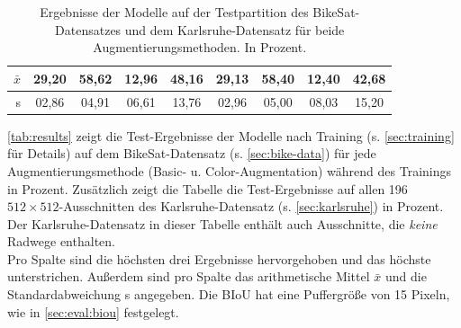 \begin{table}[ht]
\begin{tabular}{l|cc|cc|cc|cc}
		\bottomrule
		\multicolumn{1}{r|}{$\bar{x}$} & 29,20 & 58,62 & 12,96 & 48,16 & 29,13 & 58,40 & 12,40 & 42,68 \\
		\midrule
		\multicolumn{1}{r|}{s} & 02,86 & 04,91 & 06,61 & 13,76 & 02,96 & 05,00 & 08,03 & 15,20 \\


	\end{tabular}
	\caption{Ergebnisse der Modelle auf der Testpartition des BikeSat-Datensatzes und dem Karlsruhe-Datensatz
	für beide Augmentierungsmethoden. 
    In Prozent.}
	\label{tab:results}
\end{table}

\autoref{tab:results} zeigt die Test-Ergebnisse der Modelle nach Training (s. \autoref{sec:training} für Details) auf dem BikeSat-Datensatz 
(s. \autoref{sec:bike-data}) für jede Augmentierungsmethode (Basic- u. Color-Augmentation) während des Trainings in Prozent. 
Zusätzlich zeigt die Tabelle die Test-Ergebnisse auf allen 196 $512{\times}512$-Ausschnitten 
des Karlsruhe-Datensatz (s. \autoref{sec:karlsruhe}) in Prozent. Der Karlsruhe-Datensatz in dieser Tabelle
enthält auch Ausschnitte, die \textit{keine} Radwege enthalten. \\ 
Pro Spalte sind die höchsten drei Ergebnisse hervorgehoben und das höchste unterstrichen. 
Außerdem sind pro Spalte das arithmetische Mittel $\bar{x}$ und die Standardabweichung s angegeben. 
Die \ac{BIoU} hat eine Puffergröße von 15 Pixeln, wie in \autoref{sec:eval:biou} festgelegt.
